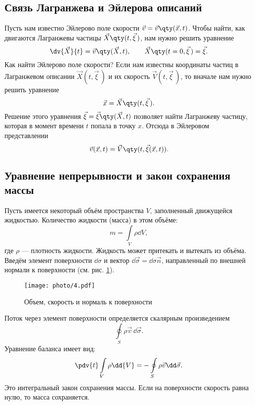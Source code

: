 \subsection{Связь Лагранжева и Эйлерова описаний}
Пусть нам известно Эйлерово поле скорости $ \vec{v}=\vec{v}\qty(\vec{x}, t) $. Чтобы найти, как двигаются Лагранжевы частицы $ \vec{X}\qty(t, \vec{\xi}\,) $, нам нужно решить уравнение
\begin{equation}
\dv{\vec{X}}{t}=\vec{v}\qty(\vec{X}, t), \qquad
\vec{X}\qty(t=0, \vec{\xi}\,)=\vec{\xi}.
\end{equation}
Как найти Эйлерово поле скорости? Если нам известны координаты частиц в Лагранжевом описании $ \vec{X}(t, \vec{\xi}\,) $ и их скорость $ \vec{V}(t, \vec{\xi}\,) $, то вначале нам нужно решить уравнение
\begin{equation}
\vec{x}=\vec{X}\qty(t, \vec{\xi}\,).
\end{equation}
Решение этого уравнения $\vec{\xi}=\vec{\xi}\qty(\vec{X}, t)$
позволяет найти Лагранжеву частицу, которая в момент времени $t$ попала в точку $x$. Отсюда в Эйлеровом представлении
\begin{equation}
\vec{v}(\vec{x}, t)=\vec{V}\qty(t, \vec{\xi}(\vec{x}, t)).
\end{equation}




\subsection{Уравнение непрерывности и закон сохранения массы}
Пусть имеется некоторый объём пространства $V$, заполненный движущейся  жидкостью. Количество жидкости (масса) в этом объёме:
\begin{equation}
m=\int\limits_{V} \rho\dd{V}\!,
\end{equation}
где $\rho$ --- плотность жидкости. Жидкость может притекать и вытекать из объёма. Введём элемент поверхности $ \dd\sigma $ и вектор $ \dd \vec{\sigma}=\dd\sigma \vec{n} $, направленный по внешней нормали к поверхности (см. рис. \ref{fig:vvn}).
\begin{figure}[H]
	\vspace{-10pt}
	\centering
	\texttt{[image: photo/4.pdf]}
	\caption{Объем, скорость и нормаль к поверхности}
	\label{fig:vvn}
\end{figure}
\noindent Поток через элемент поверхности определяется скалярным произведением
\begin{equation}
\oint\limits_{S} \rho \vec{v}\, \dd\vec{\sigma}.
\end{equation}
Уравнение баланса имеет вид:
\begin{equation}\begin{aligned}
\pdv{t} \int\limits_{V} \rho\dd{V}=-\oint\limits_{S} \rho \vec{v} \dd\vec{\sigma}.
\end{aligned}\end{equation}
Это интегральный закон сохранения массы. Если на поверхности скорость равна нулю, то масса сохраняется.

